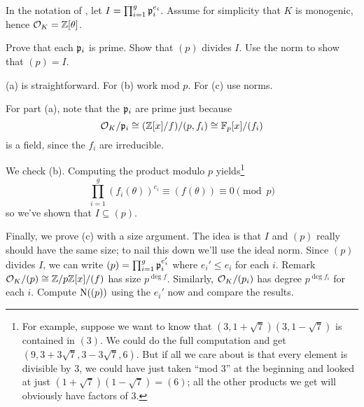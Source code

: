 \begin{problem}
	\label{prob:prove_factoring_algorithm}
	In the notation of , let $I = \prod_{i=1}^g \mathfrak p_i^{e_i}$.
	Assume for simplicity that $K$ is monogenic, hence $\mathcal O_K = \mathbb Z[\theta]$.
	\begin{enumerate}[(a)]
		\ii Prove that each $\mathfrak p_i$ is prime.
		\ii Show that $(p)$ divides $I$.
		\ii Use the norm to show that $(p) = I$.
	\end{enumerate}
	\begin{hint}
		(a) is straightforward.
		For (b) work mod $p$.
		For (c) use norms.
	\end{hint}
	\begin{sol}
	For part (a), note that the $\mathfrak p_i$ are prime
	just because 
	\[ \mathcal O_K / \mathfrak p_i
		\cong (\mathbb Z[x] / f) / (p, f_i)
		\cong \mathbb F_p[x] / (f_i) \]
	is a field, since the $f_i$ are irreducible.

	We check (b).
		Computing the product modulo $p$ yields\footnote{%
			For example, suppose we want to know that $(3, 1+\sqrt{7})(3, 1-\sqrt{7})$ is contained in $(3)$.
			We could do the full computation and get $(9, 3+3\sqrt{7}, 3-3\sqrt{7}, 6)$.
			But if all we care about is that every element is divisible by $3$, we could have just taken ``mod $3$''
			at the beginning and looked at just $(1+\sqrt{7})(1-\sqrt{7}) = (6)$;
			all the other products we get will obviously have factors of $3$.
		}
		\[ \prod_{i=1}^{g} (f_i(\theta))^{e_i}
			\equiv (f(\theta)) \equiv 0 \pmod p \]
		so we've shown that $I \subseteq (p)$.

	Finally, we prove (c) with a size argument.
		The idea is that $I$ and $(p)$ really should have the same size;
		to nail this down we'll use the ideal norm.
		Since $(p)$ divides $I$, we can write
		$ (p) = \prod_{i=1}^g \mathfrak p_i^{e_i'} $
		where $e_i' \le e_i$ for each $i$.
		Remark $\mathcal O_K / (p) \cong \mathbb Z/p\mathbb Z[x] / (f)$ has size $p^{\deg f}$.
		Similarly, $\mathcal O_K / (p_i)$ has degree $p^{\deg f_i}$ for each $i$.
		Compute $\operatorname{N}( (p) )$ using the $e_i'$ now and compare the results.
	\end{sol}
\end{problem}
